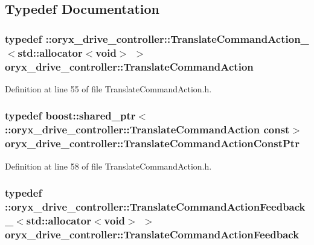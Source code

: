 \subsection{\-Typedef \-Documentation}
\subsubsection[{\-Translate\-Command\-Action}]{\setlength{\rightskip}{0pt plus 5cm}typedef \-::{\bf oryx\-\_\-drive\-\_\-controller\-::\-Translate\-Command\-Action\-\_\-}$<$std\-::allocator$<$void$>$ $>$ {\bf oryx\-\_\-drive\-\_\-controller\-::\-Translate\-Command\-Action}}\label{namespaceoryx__drive__controller_a7d298c9bf3b5985e1faa7bdfe244d682}


\-Definition at line 55 of file \-Translate\-Command\-Action.\-h.

\subsubsection[{\-Translate\-Command\-Action\-Const\-Ptr}]{\setlength{\rightskip}{0pt plus 5cm}typedef boost\-::shared\-\_\-ptr$<$ \-::{\bf oryx\-\_\-drive\-\_\-controller\-::\-Translate\-Command\-Action} const$>$ {\bf oryx\-\_\-drive\-\_\-controller\-::\-Translate\-Command\-Action\-Const\-Ptr}}\label{namespaceoryx__drive__controller_a849c8af20eac82d7eccb065c93516c8e}


\-Definition at line 58 of file \-Translate\-Command\-Action.\-h.

\subsubsection[{\-Translate\-Command\-Action\-Feedback}]{\setlength{\rightskip}{0pt plus 5cm}typedef \-::{\bf oryx\-\_\-drive\-\_\-controller\-::\-Translate\-Command\-Action\-Feedback\-\_\-}$<$std\-::allocator$<$void$>$ $>$ {\bf oryx\-\_\-drive\-\_\-controller\-::\-Translate\-Command\-Action\-Feedback}}\label{namespaceoryx__drive__controller_af06e011a6817c045f6ca89ab783e4c84}


